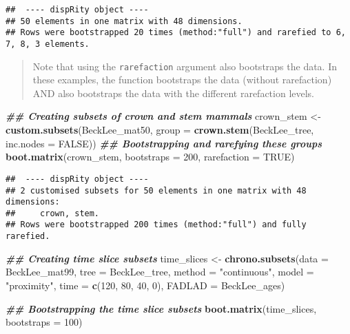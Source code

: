 \documentclass[
]{book}
\newenvironment{Shaded}{\begin{snugshade}}{\end{snugshade}}
\newcommand{\AttributeTok}[1]{\textcolor[rgb]{0.13,0.29,0.53}{#1}}
\newcommand{\ConstantTok}[1]{\textcolor[rgb]{0.56,0.35,0.01}{#1}}
\newcommand{\DecValTok}[1]{\textcolor[rgb]{0.00,0.00,0.81}{#1}}
\newcommand{\DocumentationTok}[1]{\textcolor[rgb]{0.56,0.35,0.01}{\textbf{\textit{#1}}}}
\newcommand{\FunctionTok}[1]{\textcolor[rgb]{0.13,0.29,0.53}{\textbf{#1}}}
\newcommand{\NormalTok}[1]{#1}
\newcommand{\OtherTok}[1]{\textcolor[rgb]{0.56,0.35,0.01}{#1}}
\newcommand{\StringTok}[1]{\textcolor[rgb]{0.31,0.60,0.02}{#1}}
\begin{document}
\begin{verbatim}
##  ---- dispRity object ---- 
## 50 elements in one matrix with 48 dimensions.
## Rows were bootstrapped 20 times (method:"full") and rarefied to 6, 7, 8, 3 elements.
\end{verbatim}

\begin{quote}
Note that using the \texttt{rarefaction} argument also bootstraps the data. In these examples, the function bootstraps the data (without rarefaction) AND also bootstraps the data with the different rarefaction levels.
\end{quote}

\begin{Shaded}
\begin{Highlighting}[]
\DocumentationTok{\#\# Creating subsets of crown and stem mammals}
\NormalTok{crown\_stem }\OtherTok{\textless{}{-}} \FunctionTok{custom.subsets}\NormalTok{(BeckLee\_mat50,}
                             \AttributeTok{group =} \FunctionTok{crown.stem}\NormalTok{(BeckLee\_tree,}
                                                \AttributeTok{inc.nodes =} \ConstantTok{FALSE}\NormalTok{))}
\DocumentationTok{\#\# Bootstrapping and rarefying these groups}
\FunctionTok{boot.matrix}\NormalTok{(crown\_stem, }\AttributeTok{bootstraps =} \DecValTok{200}\NormalTok{, }\AttributeTok{rarefaction =} \ConstantTok{TRUE}\NormalTok{)}
\end{Highlighting}
\end{Shaded}

\begin{verbatim}
##  ---- dispRity object ---- 
## 2 customised subsets for 50 elements in one matrix with 48 dimensions:
##     crown, stem.
## Rows were bootstrapped 200 times (method:"full") and fully rarefied.
\end{verbatim}

\begin{Shaded}
\begin{Highlighting}[]
\DocumentationTok{\#\# Creating time slice subsets}
\NormalTok{time\_slices }\OtherTok{\textless{}{-}} \FunctionTok{chrono.subsets}\NormalTok{(}\AttributeTok{data =}\NormalTok{ BeckLee\_mat99,}
                              \AttributeTok{tree =}\NormalTok{ BeckLee\_tree, }
                              \AttributeTok{method =} \StringTok{"continuous"}\NormalTok{,}
                              \AttributeTok{model =} \StringTok{"proximity"}\NormalTok{, }
                              \AttributeTok{time =} \FunctionTok{c}\NormalTok{(}\DecValTok{120}\NormalTok{, }\DecValTok{80}\NormalTok{, }\DecValTok{40}\NormalTok{, }\DecValTok{0}\NormalTok{),}
                              \AttributeTok{FADLAD =}\NormalTok{ BeckLee\_ages)}

\DocumentationTok{\#\# Bootstrapping the time slice subsets}
\FunctionTok{boot.matrix}\NormalTok{(time\_slices, }\AttributeTok{bootstraps =} \DecValTok{100}\NormalTok{)}
\end{Highlighting}
\end{Shaded}
\end{document}
